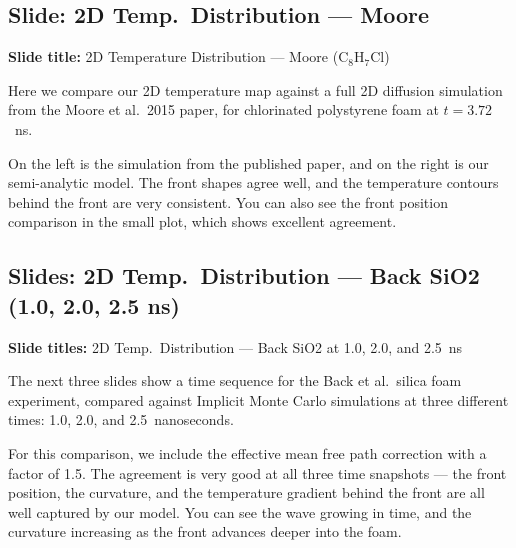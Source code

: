 \documentclass[12pt, a4paper]{article}
\begin{document}
\subsection{Slide: 2D Temp.\ Distribution --- Moore}

\begin{slidebox}
\textbf{Slide title:} 2D Temperature Distribution --- Moore ($\mathrm{C}_8\mathrm{H}_7\mathrm{Cl}$)
\end{slidebox}

Here we compare our 2D temperature map against a full 2D diffusion simulation from the Moore et al.\ 2015 paper, for chlorinated polystyrene foam at $t = 3.72$~ns.

On the left is the simulation from the published paper, and on the right is our semi-analytic model. The front shapes agree well, and the temperature contours behind the front are very consistent. You can also see the front position comparison in the small plot, which shows excellent agreement.

\subsection{Slides: 2D Temp.\ Distribution --- Back SiO2 (1.0, 2.0, 2.5 ns)}

\begin{slidebox}
\textbf{Slide titles:} 2D Temp.\ Distribution --- Back SiO2 at 1.0, 2.0, and 2.5~ns
\end{slidebox}

The next three slides show a time sequence for the Back et al.\ silica foam experiment, compared against Implicit Monte Carlo simulations at three different times: 1.0, 2.0, and 2.5~nanoseconds.

For this comparison, we include the effective mean free path correction with a factor of 1.5. The agreement is very good at all three time snapshots --- the front position, the curvature, and the temperature gradient behind the front are all well captured by our model. You can see the wave growing in time, and the curvature increasing as the front advances deeper into the foam.

\end{document}
